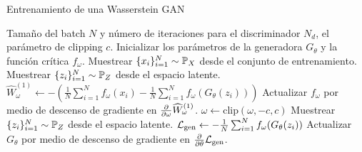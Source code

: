 {{        \begin{algorithm}[ht!]
            \caption{Entrenamiento de una Wasserstein GAN}\label{alg:WGAN}
            \begin{algorithmic}[1]
                \Require Tamaño del batch $N$ y número de iteraciones para el discriminador $N_d$, el parámetro de clipping $c$.
                \State Inicializar los parámetros de la generadora $G_\theta$ y la función crítica $f_\omega$.
                \State Muestrear $\{x_i\}_{i=1}^{N} \sim \Prob_X$ desde el conjunto de entrenamiento.
                \State Muestrear $\{z_i\}_{i=1}^{N} \sim \Prob_Z$ desde el espacio latente.
                \State $\widehat W_{\omega}^{(1)} \gets - \left( \frac{1}{N}\sum_{i=1}^{N} f_{\omega}(x_i) - \frac{1}{N}\sum_{i=1}^{N} f_{\omega}(G_{\theta}(z_i)) \right)$
                \State Actualizar $f_{\omega}$ por medio de descenso de gradiente en $\pdv{\omega} \widehat W_{\omega}^{(1)}$.
                \State $\omega \gets \text{clip}(\omega, -c, c)$
                \EndFor
                \State Muestrear $\{z_i\}_{i=1}^{N} \sim \Prob_Z$ desde el espacio latente.
                \State $\mathcal{L}_{\mathrm{gen}} \gets - \frac{1}{N}\sum_{i=1}^{N} f_\omega(G_\theta(z_i))$
                \State Actualizar $G_\theta$ por medio de descenso de gradiente en $\pdv{\theta} \mathcal{L}_{\mathrm{gen}}$.
                \EndWhile
            \end{algorithmic}
        \end{algorithm}

    }  %
}  %